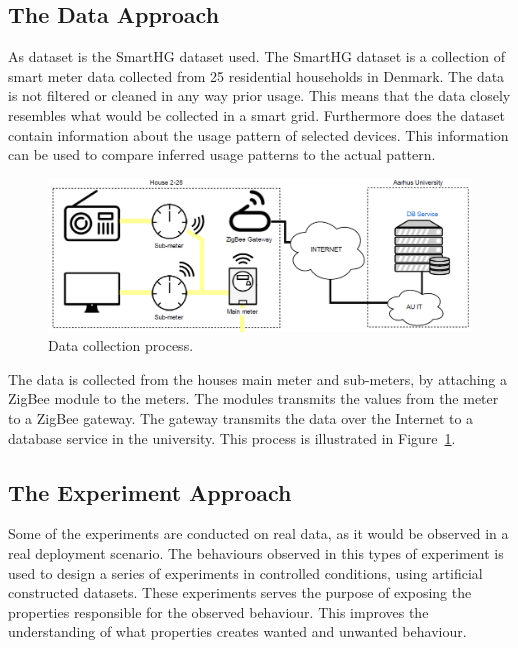 \subsection{The Data Approach}
As dataset is the SmartHG dataset used. The SmartHG dataset is a collection of smart meter data collected from 25 residential households in Denmark. The data is not filtered or cleaned in any way prior usage. This means that the data closely resembles what would be collected in a smart grid. Furthermore does the dataset contain information about the usage pattern of selected devices. This information can be used to compare inferred usage patterns to the actual pattern. 

\begin{figure}[H]
\centering
\includegraphics[width=1\textwidth]{billeder/DataCollection.png}
\caption{Data collection process.}
\label{fig:DCP}
\end{figure}
The data is collected from the houses main meter and sub-meters, by attaching a ZigBee module to the meters. The modules transmits the values from the meter to a ZigBee gateway. The gateway transmits the data over the Internet to a database service in the university. This process is illustrated in Figure~\ref{fig:DCP}.

\subsection{The Experiment Approach}
Some of the experiments are conducted on real data, as it would be observed in a real deployment scenario. The behaviours observed in this types of experiment is used to design a series of experiments in controlled conditions, using artificial constructed datasets. These experiments serves the purpose of exposing the properties responsible for the observed behaviour. This improves the understanding of what properties creates wanted and unwanted behaviour.